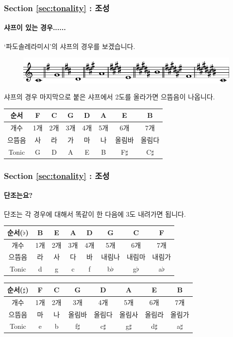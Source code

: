 \documentclass{beamer}
\begin{document}
	\begin{frame}
		\frametitle{Section \ref{sec:tonality} : 조성}
		\framesubtitle{샤프이 있는 경우......}
		`파도솔레라미시'의 샤프의 경우를 보겠습니다.
		\begin{figure}
			\centering
			\includegraphics[width=\textwidth]{res/pdf/8/tone/sharp.pdf}
		\end{figure}
		샤프의 경우 마지막으로 붙은 샤프에서 2도를 올라가면 으뜸음이 나옵니다.
		\vskip -0.5pc
		\begin{table}
			\small
			\begin{tabular}{|c|c|c|c|c|c|c|c|}
				\hline
				순서 & F & C & G & D & A & E & B \\ \hline
				개수 & 1개 & 2개 & 3개 & 4개 & 5개 & 6개 & 7개 \\ \hline
				으뜸음 & 사 & 라 & 가 & 마 & 나 & 올림바 & 올림다 \\ \hline
				Tonic & G & D & A & E & B & F$\sharp$ & C$\sharp$ \\ \hline
			\end{tabular}
		\end{table}
	\end{frame}
	
	\begin{frame}
		\frametitle{Section \ref{sec:tonality} : 조성}
		\framesubtitle{단조는요?}
		단조는 각 경우에 대해서 똑같이 한 다음에 3도 내려가면 됩니다.
		\begin{table}
			\small
			\begin{tabular}{|c|c|c|c|c|c|c|c|}
				\hline
				순서($\flat$) & B & E & A & D & G & C & F \\ \hline
				개수 & 1개 & 2개 & 3개 & 4개 & 5개 & 6개 & 7개 \\ \hline
				으뜸음 & 라 & 사 & 다 & 바 & 내림나 & 내림마 & 내림가 \\ \hline
				Tonic & d & g & c & f & b$\flat$ & g$\flat$ & a$\flat$ \\ \hline
			\end{tabular}
		\end{table}
		\begin{table}
			\small
			\begin{tabular}{|c|c|c|c|c|c|c|c|}
				\hline
				순서($\sharp$) & F & C & G & D & A & E & B \\ \hline
				개수 & 1개 & 2개 & 3개 & 4개 & 5개 & 6개 & 7개 \\ \hline
				으뜸음 & 마 & 나 & 올림바 & 올림다 & 올림사 & 올림라 & 올림가 \\ \hline
				Tonic & e & b & f$\sharp$ & c$\sharp$ & g$\sharp$ & d$\sharp$ & a$\sharp$ \\ \hline
			\end{tabular}
		\end{table}
	\end{frame}
	
\end{document}

